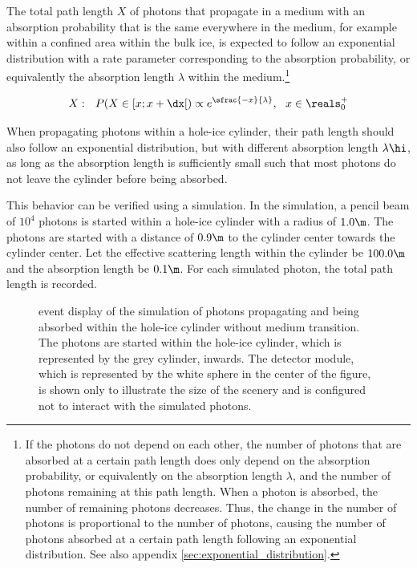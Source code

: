 The total path length $X$ of photons that propagate in a medium with an absorption probability that is the same everywhere in the medium, for example within a confined area within the bulk ice, is expected to follow an exponential distribution with a rate parameter corresponding to the absorption probability, or equivalently the absorption length $\lambda$ within the medium.\footnote{If the photons do not depend on each other, the number of photons that are absorbed at a certain path length does only depend on the absorption probability, or equivalently on the absorption length $\lambda$, and the number of photons remaining at this path length. When a photon is absorbed, the number of remaining photons decreases. Thus, the change in the number of photons is proportional to the number of photons, causing the number of photons absorbed at a certain path length following an exponential distribution. See also appendix \ref{sec:exponential_distribution}.}

\begin{equation}
  X: \ \ P(X \in [x; x + \dx[) \propto e^{\sfrac{-x}{\lambda}}, \ \ x \in \reals^+_0
\end{equation}

When propagating photons within a hole-ice cylinder, their path length should also follow an exponential distribution, but with different absorption length $\lambda\hi$, as long as the absorption length is sufficiently small such that most photons do not leave the cylinder before being absorbed.

This behavior can be verified using a simulation.
In the simulation, a pencil beam of $10^4$ photons is started within a hole-ice cylinder with a radius of $1.0\m$. The photons are started with a distance of $0.9\m$ to the cylinder center towards the cylinder center. Let the effective scattering length within the cylinder be $100.0\m$ and the absorption length be $0.1\m$. For each simulated photon, the total path length is recorded.


\begin{figure}[htb]
  \caption{\steamshovel event display of the simulation of photons propagating and being absorbed within the hole-ice cylinder without medium transition. The photons are started within the hole-ice cylinder, which is represented by the grey cylinder, inwards. The detector module, which is represented by the white sphere in the center of the figure, is shown only to illustrate the size of the scenery and is configured not to interact with the simulated photons.}
\end{figure}

